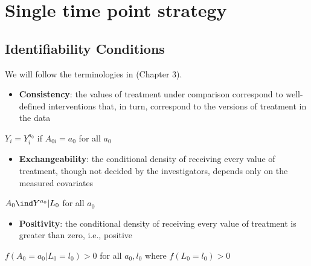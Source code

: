 \documentclass[dvipdfmx,10pt]{article}
\begin{document}
\section{Single time point strategy}
\label{sec:orgfbc046d}
\subsection{Identifiability Conditions}
\label{sec:orgdd14444}
We will follow the terminologies in \cite{hernanCausalInference2019} (Chapter 3).
\begin{itemize}
\item \textbf{Consistency}: the values of treatment under comparison correspond to well-defined interventions that, in turn, correspond to the versions of treatment in the data
\end{itemize}
\begin{center}
\(Y_{i} = Y_{i}^{a_{0}}\) if \(A_{0i} = a_{0}\) for all \(a_{0}\)
\end{center}
\begin{itemize}
\item \textbf{Exchangeability}: the conditional density of receiving every value of treatment, though not decided by the investigators, depends only on the measured covariates
\end{itemize}
\begin{center}
\(A_{0} \ind Y^{a_{0}} | L_{0}\) for all \(a_{0}\)
\end{center}
\begin{itemize}
\item \textbf{Positivity}: the conditional density of receiving every value of treatment is greater than zero, i.e., positive
\end{itemize}
\begin{center}
\(f(A_{0} = a_{0} | L_{0} = l_{0}) > 0\) for all \(a_{0},l_{0}\) where \(f(L_{0} = l_{0}) > 0\)
\end{center}
\end{document}
